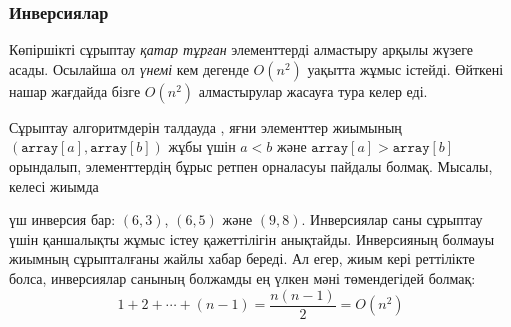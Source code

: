 \begin{center}
\end{center}

\begin{center}
\end{center}

\subsubsection{Инверсиялар}


Көпіршікті сұрыптау \emph{қатар тұрған}
элементтерді алмастыру арқылы жүзеге асады.
Осылайша ол \emph{үнемі}
кем дегенде $O(n^2)$ уақытта жұмыс істейді.
Өйткені нашар жағдайда бізге
$O(n^2)$ алмастырулар жасауға тура келер еді.

Сұрыптау алгоритмдерін талдауда , яғни
элементтер жиымының 
$(\texttt{array}[a],\texttt{array}[b])$ жұбы үшін
$a<b$ және $\texttt{array}[a]>\texttt{array}[b]$ орындалып, элементтердің бұрыс ретпен орналасуы пайдалы болмақ.
Мысалы, келесі жиымда
\begin{center}
\end{center}
үш инверсия бар: $(6,3)$, $(6,5)$ және $(9,8)$.
Инверсиялар саны
сұрыптау үшін қаншалықты жұмыс істеу қажеттілігін анықтайды.
Инверсияның болмауы жиымның сұрыпталғаны жайлы хабар береді.
Ал егер, жиым кері реттілікте болса,
инверсиялар санының болжамды ең үлкен мәні төмендегідей болмақ:
\[1+2+\cdots+(n-1)=\frac{n(n-1)}{2} = O(n^2)\]

